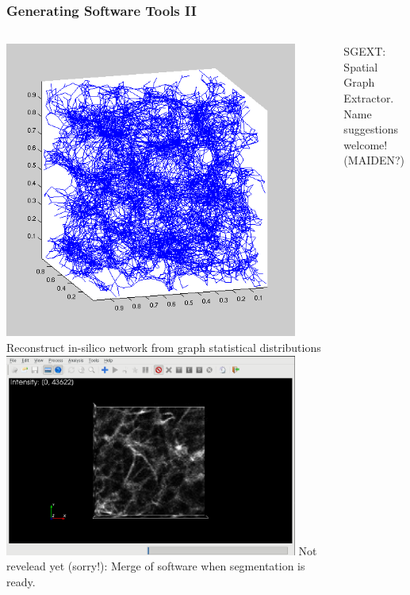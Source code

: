\documentclass[9pt]{beamer}
\begin{document}
\begin{frame}
  \frametitle{Generating Software Tools II}
  \begin{columns}[onlytextwidth]
      \includegraphics[width=0.9\textwidth]{./Figures/chapter-reconstruct/networkN10000.png}
      \vspace{1cm}
      Reconstruct in-silico network from graph statistical distributions
      \includegraphics[width=0.9\textwidth]{./Figures/software_screenshots/sgext.png}
      \vspace{1cm}
      Not revelead yet (sorry!): Merge of software when segmentation is ready.

      SGEXT: Spatial Graph Extractor. Name suggestions welcome! (MAIDEN?)
  \end{columns}
\end{frame}
\end{document}
